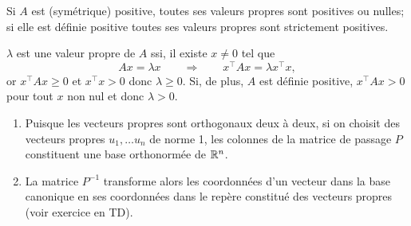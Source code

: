 \begin{proposition}
  Si $A$ est (symétrique) positive, toutes ses valeurs propres sont positives ou nulles; si elle est définie positive toutes ses valeurs propres sont strictement positives.
\end{proposition}

\proof
$\lambda$ est une valeur propre de $A$ ssi, il existe $x \neq 0$ tel que
$$
Ax = \lambda x \qquad \Rightarrow \qquad x^\top A x = \lambda x^\top x,
$$
or $x^\top A x \geq 0$ et $x^\top x > 0$ donc $\lambda \geq 0$. Si, de plus, $A$ est définie positive, $x^\top A x > 0$ pour tout $x$ non nul et donc $\lambda > 0$.
\eproof

% 

\remark
\begin{enumerate}
 \item Puisque les vecteurs propres sont orthogonaux deux à deux, si on choisit des vecteurs propres $u_1, \dots u_n$ de norme 1, les colonnes de la matrice de passage $P$ constituent une base orthonormée de $\mathbb{R}^n$. 
 \item La matrice $P^{-1}$ transforme alors les coordonnées d'un vecteur dans la base canonique en ses coordonnées dans le repère constitué des vecteurs propres (voir exercice en TD).
\end{enumerate}



